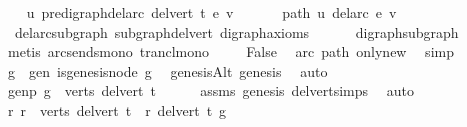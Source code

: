 \begin{isabellebody}
\ \ \isamarkupfalse%
\ {\isachardoublequoteopen}u\ {\isasymrightarrow}\isactrlsup {\isacharplus}{\kern0pt}\isactrlbsub pre{\isacharunderscore}{\kern0pt}digraph{\isachardot}{\kern0pt}del{\isacharunderscore}{\kern0pt}arc\ {\isacharparenleft}{\kern0pt}del{\isacharunderscore}{\kern0pt}vert\ t{\isacharparenright}{\kern0pt}\ e\isactrlesub \ v{\isachardoublequoteclose}\ \isanewline
\ \ \isamarkupfalse%
\ \isamarkupfalse%
\ path{\isacharcolon}{\kern0pt}\ {\isachardoublequoteopen}u\ {\isasymrightarrow}\isactrlsup {\isacharplus}{\kern0pt}\isactrlbsub del{\isacharunderscore}{\kern0pt}arc\ e\isactrlesub \ v{\isachardoublequoteclose}\isanewline
\ \ \ \ \isamarkupfalse%
\ \ del{\isacharunderscore}{\kern0pt}arc{\isacharunderscore}{\kern0pt}subgraph\ subgraph{\isacharunderscore}{\kern0pt}del{\isacharunderscore}{\kern0pt}vert\ digraph{\isacharunderscore}{\kern0pt}axioms\isanewline
\ \ \ \ \ \ digraph{\isacharunderscore}{\kern0pt}subgraph\ \isanewline
\ \ \ \ \isamarkupfalse%
\ {\isacharparenleft}{\kern0pt}metis\ arcs{\isacharunderscore}{\kern0pt}ends{\isacharunderscore}{\kern0pt}mono\ trancl{\isacharunderscore}{\kern0pt}mono{\isacharparenright}{\kern0pt}\ \isanewline
\ \ \isamarkupfalse%
\ False\ \isamarkupfalse%
\ arc\ path\ only{\isacharunderscore}{\kern0pt}new\ \isamarkupfalse%
\ simp\isanewline
{}\isamarkupfalse%
\isanewline
\ \ \isamarkupfalse%
\ g\ \ gen{\isacharcolon}{\kern0pt}\ {\isachardoublequoteopen}is{\isacharunderscore}{\kern0pt}genesis{\isacharunderscore}{\kern0pt}node\ g{\isachardoublequoteclose}\ \isamarkupfalse%
\ genesisAlt\ genesis\ \isamarkupfalse%
\ auto\isanewline
\ \ \isamarkupfalse%
\ \isamarkupfalse%
\ genp{\isacharcolon}{\kern0pt}\ {\isachardoublequoteopen}g\ {\isasymin}\ verts\ {\isacharparenleft}{\kern0pt}del{\isacharunderscore}{\kern0pt}vert\ t{\isacharparenright}{\kern0pt}{\isachardoublequoteclose}\isanewline
\ \ \ \ \isamarkupfalse%
\ assms{\isacharparenleft}{\kern0pt}{}{\isacharparenright}{\kern0pt}\ genesis\ del{\isacharunderscore}{\kern0pt}vert{\isacharunderscore}{\kern0pt}simps\ \isamarkupfalse%
\ auto\isanewline
\ \ \isamarkupfalse%
\ {\isachardoublequoteopen}{\isacharparenleft}{\kern0pt}{\isasymforall}r{\isachardot}{\kern0pt}\ r\ {\isasymin}\ verts\ {\isacharparenleft}{\kern0pt}del{\isacharunderscore}{\kern0pt}vert\ t{\isacharparenright}{\kern0pt}\ {\isasymlongrightarrow}\ r\ {\isasymrightarrow}\isactrlsup {\isacharasterisk}{\kern0pt}\isactrlbsub del{\isacharunderscore}{\kern0pt}vert\ t\isactrlesub \ g{\isacharparenright}{\kern0pt}{\isachardoublequoteclose}\ \isanewline

\end{isabellebody}
